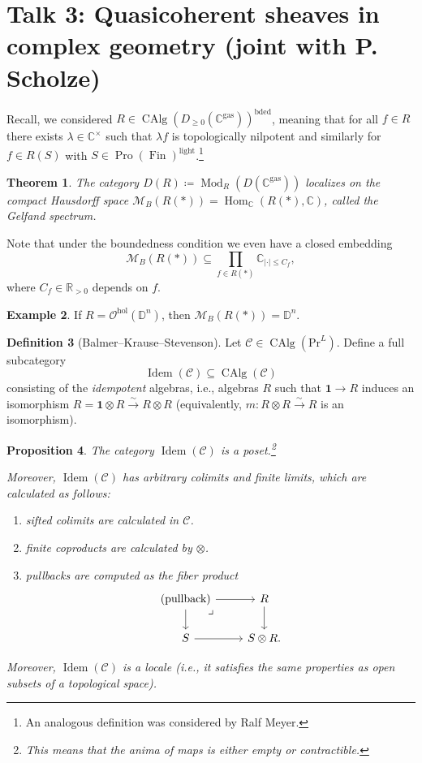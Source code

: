 \documentclass[draft]{amsart}
\newcommand{\DD}{\mathbb{D}}
\newcommand{\RR}{\mathbb{R}}
\newcommand{\CC}{\mathbb{C}}
\renewcommand{\O}{\mathcal{O}}
\newcommand{\cat}[1]{\mathcal{#1}}
\newcommand{\isoto}{\mathbin{\xrightarrow{\sim}}}
\renewcommand{\Pr}{\mathrm{Pr}}
\newcommand{\one}{\mathbf{1}}
\DeclareMathOperator{\Hom}{Hom}
\DeclareMathOperator{\Idem}{Idem}
\DeclareMathOperator{\CAlg}{CAlg}
\DeclareMathOperator{\Mod}{Mod}
\DeclareMathOperator{\Pro}{Pro}
\DeclareMathOperator{\Fin}{Fin}
\newtheorem{thm}{Theorem}[section]
\newtheorem{prop}[thm]{Proposition}
\theoremstyle{definition}
\newtheorem{defn}[thm]{Definition}
\newtheorem{ex}[thm]{Example}
\begin{document}
\section{Talk 3: Quasicoherent sheaves in complex geometry (joint with P. Scholze)}
Recall, we considered $R \in \CAlg(D_{\ge0}(\CC^{\mathrm{gas}}))^{\mathrm{bded}}$, meaning that for all $f\in R$ there exists $\lambda\in \CC^\times$ such that $\lambda f$ is topologically nilpotent and similarly for $f\in R(S)$ with $S \in \Pro(\Fin)^{\mathrm{light}}$.\footnote{An analogous definition was considered by Ralf  Meyer.}

\begin{thm}\label{Clausen:Gelfand}
The category $D(R) \coloneqq \Mod_R(D(\CC^{\mathrm{gas}}))$ localizes on the compact Hausdorff space $\cat M_B(R(*)) = \Hom_{\CC}(R(*), \CC)$, called the \emph{Gelfand spectrum}.
\end{thm}

Note that under the boundedness condition we even have a closed embedding
\[
\cat M_B(R(*)) \subseteq \prod_{f\in R(*)} \CC_{\lvert\cdot\rvert \le C_f},
\]
where $C_f \in \RR_{>0}$ depends on $f$.

\begin{ex}
If $R = \O^{\mathrm{hol}}(\DD^n)$, then $\cat M_B(R(*)) = \DD^n$.
\end{ex}

\begin{defn}[Balmer--Krause--Stevenson]
Let $\cat C \in \CAlg(\Pr^L)$. Define a full subcategory
\[
\Idem(\cat C) \subseteq \CAlg(\cat C)
\]
consisting of the \emph{idempotent} algebras, i.e., algebras $R$ such that $\one\to R$ induces an isomorphism $R = \one\otimes R \isoto R\otimes R$ (equivalently, $m\colon R\otimes R\isoto R$ is an isomorphism).
\end{defn}

\begin{prop}
The category $\Idem(\cat C)$ is a poset.\footnote{This means that the anima of maps is either empty or contractible.}

Moreover, $\Idem(\cat C)$ has arbitrary colimits and finite limits, which are calculated as follows:
\begin{enumerate}[(1)]
\item sifted colimits are calculated in $\cat C$.
\item finite coproducts are calculated by $\otimes$.
\item pullbacks are computed as the fiber product 
\[
\begin{tikzcd}
\text{(pullback)} \ar[d] \ar[r] \ar[dr,phantom, very near start, "\lrcorner"] & R \ar[d] \\
S \ar[r] & S\otimes R.
\end{tikzcd}
\]
\end{enumerate}
Moreover, $\Idem(\cat C)$ is a \emph{locale} (i.e., it satisfies the same properties as open subsets of a topological space).
\end{prop}
\end{document}
